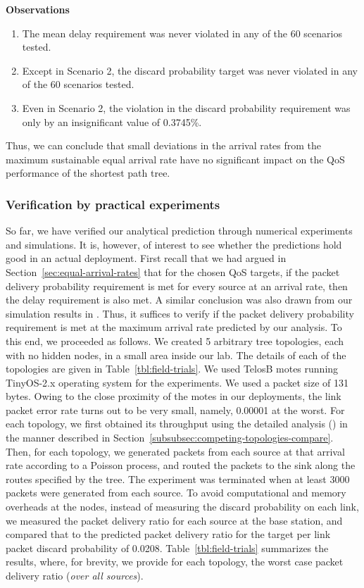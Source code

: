 \documentclass[12pt, draftclsnofoot, onecolumn]{IEEEtran}
\begin{document}
\textbf{Observations}
\begin{enumerate}
\item The mean delay requirement was never violated in any of the 60 scenarios tested.
\item Except in Scenario 2, the discard probability target was never violated in any of the 60 scenarios tested.
\item Even in Scenario 2, the violation in the discard probability requirement was only by an insignificant value of 0.3745\%.
\end{enumerate}
Thus, we can conclude that small deviations in the arrival rates from the maximum sustainable equal arrival rate have no significant impact on the QoS performance of the shortest path tree.

\subsubsection{Verification by practical experiments}

So far, we have verified our analytical prediction through numerical experiments and simulations. It is, however, of interest to see whether the predictions hold good in an actual deployment. First recall that we had argued in Section~\ref{sec:equal-arrival-rates} that for the chosen QoS targets, if the packet delivery probability requirement is met for every source at an arrival rate, then the delay requirement is also met. A similar conclusion was also drawn from our simulation results in \cite{srivastava}. Thus, it suffices to verify if the packet delivery probability requirement is met at the maximum arrival rate predicted by our analysis. To this end, we proceeded as follows. We created 5 arbitrary tree topologies, each with no hidden nodes, in a small area inside our lab. The details of each of the topologies are given in Table~\ref{tbl:field-trials}. We used TelosB motes running TinyOS-2.x operating system for the experiments.  We used a packet size of 131 bytes. Owing to the close proximity of the motes in our deployments, the link packet error rate turns out to be very small, namely, 0.00001 at the worst. For each topology, we first obtained its throughput using the detailed analysis (\cite{srivastava}) in the manner described in Section~\ref{subsubsec:competing-topologies-compare}. Then, for each topology, we generated packets from each source at that arrival rate according to a Poisson process, and routed the packets to the sink along the routes specified by the tree. The experiment was terminated when at least 3000 packets were generated from each source. To avoid computational and memory overheads at the nodes, instead of measuring the discard probability on each link, we measured the packet delivery ratio for each source at the base station, and compared that to the predicted packet delivery ratio for the target per link packet discard probability of 0.0208. Table~\ref{tbl:field-trials} summarizes the results, where, for brevity, we provide for each topology, the worst case packet delivery ratio (\emph{over all sources}). 
\end{document}
